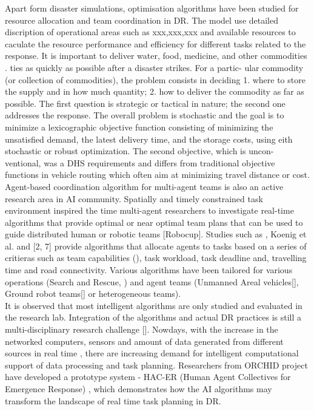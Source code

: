 Apart form disaster simulations, optimisation algorithms have been studied for resource allocation and team coordination in DR. The model use detailed discription of operational areas such as xxx,xxx,xxx and available resources to caculate the resource performance and efficiency for different tasks related to the response. It is important to deliver water, food, medicine, and other commodities .\cite{Fiedrich2000} ties as quickly as possible after a disaster strikes. For a partic- ular commodity (or collection of commodities), the problem consists in deciding 1. where to store the supply and in how much quantity; 2. how to deliver the commodity as far as possible. The first question is strategic or tactical in nature; the second one addresses the response. The overall problem is stochastic and the goal is to minimize a lexicographic objective function consisting of minimizing the unsatisfied demand, the latest delivery time, and the storage costs, using eith stochastic or robust optimization. The second objective, which is uncon- ventional, was a DHS requirements and differs from traditional objective functions in vehicle routing which often aim at minimizing travel distance or cost. \\

Agent-based coordination algorithm for multi-agent teams is also an active research area in AI community. Spatially and timely constrained task environment inspired the time multi-agent researchers to investigate real-time algorithms that provide optimal or near optimal team plans that can be used to guide distributed human or robotic teams [Robocup]. Studies such as \cite{Ramchurn2010}, Koenig et al. and [2, 7] provide algorithms that allocate agents to tasks based on a series of critieras such as team capabilities (), task workload, task deadline and, travelling time and road connectivity. Various algorithms have been tailored for various operations (Search and Rescue, ) and agent teams (Unmanned Areal vehicles[], Ground robot teams[] or heterogeneous teams).\\

It is observed that most intelligent algorithms are only studied and evaluated in the research lab. Integration of the algorithms and actual DR practices is still a multi-disciplinary research challenge []. Nowdays, with the increase in the networked computers, sensors and amount of data generated from different sources in real time \cite{Ramchurn}, there are increasing demand for intelligent computational support of data processing and task planning. Researchers from ORCHID project have developed a prototype system - HAC-ER (Human Agent Collectives for Emergence Response) \cite{Jennings2014,Ramchurn2015,Ramchurn2015a}, which demonstrates how the AI algorithms may transform the landscape of real time task planning in DR.\\

